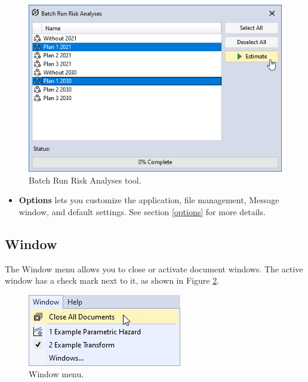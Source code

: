 \documentclass[
]{book}
\providecommand{\tightlist}{%
  \setlength{\itemsep}{0pt}\setlength{\parskip}{0pt}}
\begin{document}
\begin{figure}

{\centering \includegraphics{images/figure12} 

}

\caption{Batch Run Risk Analyses tool.}\label{fig:figure-12}
\end{figure}

\begin{itemize}
\tightlist
\item
  \textbf{Options} lets you customize the application, file management, Message window, and default settings. See section \ref{options} for more details.
\end{itemize}

\hypertarget{gui-menu-bar-window}{%
\subsection{Window}\label{gui-menu-bar-window}}

The Window menu allows you to close or activate document windows. The active window has a check mark next to it, as shown in Figure \ref{fig:figure-13}.

\begin{figure}

{\centering \includegraphics{images/figure13} 

}

\caption{Window menu.}\label{fig:figure-13}
\end{figure}
\end{document}

